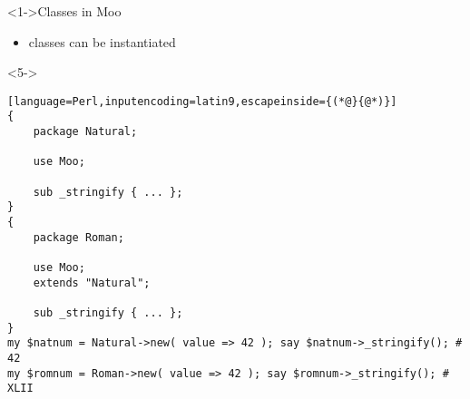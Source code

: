 \documentclass[ngerman,xcolor={table,dvipsnames},smaller,compress,hyperref={bookmarks,colorlinks}]{beamer}
\begin{document}
\begin{frame}[t,fragile]

\begin{block}<1->{Classes in Moo}
\begin{itemize}
\item classes can be instantiated
\end{itemize}
\end{block}

\begin{block}<5->{}
\scriptsize
\begin{lstlisting}[language=Perl,inputencoding=latin9,escapeinside={(*@}{@*)}]
{
    package Natural;

    use Moo;

    sub _stringify { ... };
}
{
    package Roman;

    use Moo;
    extends "Natural";

    sub _stringify { ... };
}
my $natnum = Natural->new( value => 42 ); say $natnum->_stringify(); # 42
my $romnum = Roman->new( value => 42 ); say $romnum->_stringify(); # XLII
\end{lstlisting}
\end{block}

\end{frame}
\end{document}

